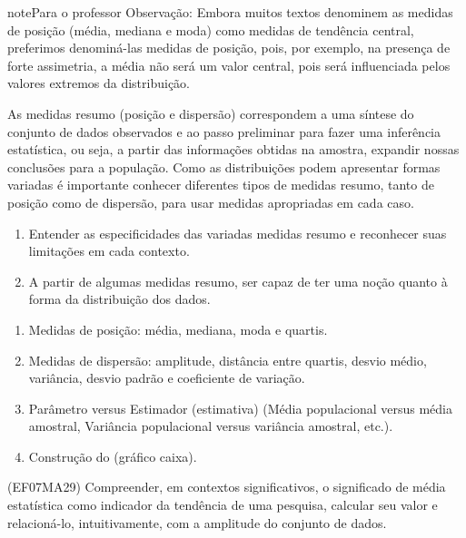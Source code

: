 \begin{sphinxadmonition}{note}{Para o professor}
Observação: Embora muitos textos denominem as medidas de posição (média, mediana e moda) como medidas de tendência central, preferimos denominá-las medidas de posição, pois, por exemplo, na presença de forte assimetria, a média não será um valor central, pois será influenciada  pelos valores extremos da distribuição.


As medidas resumo (posição e dispersão) correspondem a uma síntese do conjunto de dados observados e ao passo preliminar para fazer uma inferência estatística, ou seja, a partir das informações obtidas na amostra, expandir nossas conclusões para a população. Como as distribuições podem apresentar formas variadas é importante conhecer diferentes tipos de medidas resumo, tanto de posição como de dispersão, para usar medidas apropriadas em cada caso.

\begin{enumerate}
\item {} 
Entender as especificidades das variadas medidas resumo e reconhecer suas limitações em cada contexto.

\item {} 
A partir de algumas medidas resumo, ser capaz de ter uma noção quanto à forma da distribuição dos dados.

\end{enumerate}

\begin{enumerate}
\item {} 
Medidas de posição: média, mediana, moda e quartis.

\item {} 
Medidas de dispersão: amplitude, distância entre quartis, desvio médio, variância, desvio padrão e coeficiente de variação.

\item {} 
Parâmetro versus Estimador (estimativa) (Média populacional versus média amostral, Variância populacional versus variância amostral, etc.).

\item {} 
Construção do  (gráfico caixa).

\end{enumerate}


(EF07MA29) Compreender, em contextos significativos, o significado de média estatística como indicador da tendência de uma pesquisa, calcular seu valor e relacioná-lo, intuitivamente, com a amplitude do conjunto de dados.


\end{sphinxadmonition}
